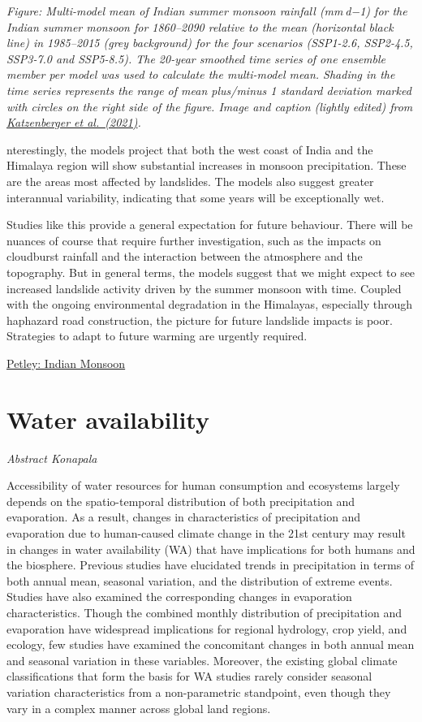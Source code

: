 \documentclass[
]{book}
\begin{document}
\emph{Figure: Multi-model mean of Indian summer monsoon rainfall (mm d−1) for the Indian summer monsoon for 1860--2090 relative to the mean (horizontal black line) in 1985--2015 (grey background) for the four scenarios (SSP1-2.6, SSP2-4.5, SSP3-7.0 and SSP5-8.5). The 20-year smoothed time series of one ensemble member per model was used to calculate the multi-model mean. Shading in the time series represents the range of mean plus/minus 1 standard deviation marked with circles on the right side of the figure. Image and caption (lightly edited) from \href{https://esd.copernicus.org/articles/12/367/2021/}{Katzenberger et al.~(2021)}.}

nterestingly, the models project that both the west coast of India and the Himalaya region will show substantial increases in monsoon precipitation. These are the areas most affected by landslides. The models also suggest greater interannual variability, indicating that some years will be exceptionally wet.

Studies like this provide a general expectation for future behaviour. There will be nuances of course that require further investigation, such as the impacts on cloudburst rainfall and the interaction between the atmosphere and the topography. But in general terms, the models suggest that we might expect to see increased landslide activity driven by the summer monsoon with time. Coupled with the ongoing environmental degradation in the Himalayas, especially through haphazard road construction, the picture for future landslide impacts is poor. Strategies to adapt to future warming are urgently required.

\href{https://blogs.agu.org/landslideblog/2021/04/15/future-warming-1/}{Petley: Indian Monsoon}

\hypertarget{water-availability}{%
\section{Water availability}\label{water-availability}}

\emph{Abstract Konapala}

Accessibility of water resources for human consumption and ecosystems largely depends on the spatio-temporal distribution of both precipitation and evaporation.
As a result, changes in characteristics of precipitation and evaporation due to human-caused climate change in the 21st century may result in changes in water availability (WA) that have implications for both humans and the biosphere.
Previous studies have elucidated trends in precipitation in terms of both annual mean, seasonal variation, and the distribution of extreme events. Studies have also examined the corresponding changes in evaporation characteristics.
Though the combined monthly distribution of precipitation and evaporation have widespread implications for regional hydrology, crop yield, and ecology, few studies have examined the concomitant changes in both annual mean and seasonal variation in these variables.
Moreover, the existing global climate classifications that form the basis for WA studies rarely consider seasonal variation characteristics from a non-parametric standpoint, even though they vary in a complex manner across global land regions.
\end{document}
